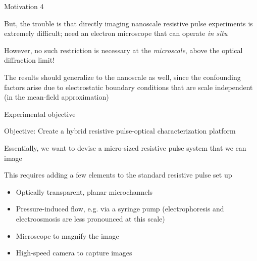 

\begin{frame}[c]{Motivation 4}
	
	But, the trouble is that directly imaging nanoscale resistive pulse experiments is extremely difficult; need an electron microscope that can operate \textit{in situ}
	
	\vspace{.2in}
	
	However, no such restriction is necessary at the \textit{microscale}, above the optical diffraction limit!
	
	\vspace{.2in}
	
	The results should generalize to the nanoscale as well, since the confounding factors arise due to electrostatic boundary conditions that are scale independent (in the mean-field approximation)
	
	\vspace{.2in}
	

\end{frame}




\begin{frame}[c]{Experimental objective}

	\textcolor{negativered}{Objective: Create a hybrid resistive pulse-optical characterization platform} \\
	
	\vspace{.1in}
	
	Essentially, we want to devise a micro-sized resistive pulse system that we can image \\
	
	\vspace{.1in}
	
	This requires adding a few elements to the standard resistive pulse set up
	
	\begin{itemize}
		\item Optically transparent, planar microchannels
		\item Pressure-induced flow, e.g. via a syringe pump (electrophoresis and electroosmosis are less pronounced at this scale)
		\item Microscope to magnify the image
		\item High-speed camera to capture images
	\end{itemize}

	
	

\end{frame}


